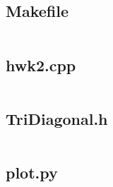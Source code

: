 \documentclass{article}
\begin{document}
\subsection*{Makefile}
\inputminted[fontsize=\footnotesize]{Makefile}{../Makefile}

\subsection*{hwk2.cpp}
\inputminted[fontsize=\footnotesize]{c++}{../hwk2.cpp}

\subsection*{TriDiagonal.h}
\inputminted[fontsize=\footnotesize]{c++}{../TriDiagonal.h}

\subsection*{plot.py}
\inputminted[fontsize=\footnotesize]{python}{../plot.py}
\end{document}

